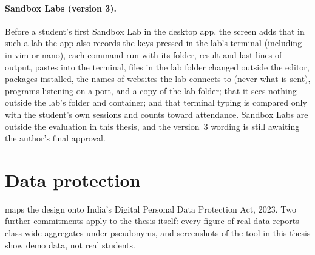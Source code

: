 \paragraph{Sandbox Labs (version 3).} Before a student's first Sandbox Lab in
the desktop app, the screen adds that in such a lab the app also records the
keys pressed in the lab's terminal (including in vim or nano), each command
run with its folder, result and last lines of output, pastes into the terminal,
files in the lab folder changed outside the editor, packages installed, the
names of websites the lab connects to (never what is sent), programs listening
on a port, and a copy of the lab folder; that it sees nothing outside the lab's
folder and container; and that terminal typing is compared only with the
student's own sessions and counts toward attendance. Sandbox Labs are outside
the evaluation in this thesis, and the version~3 wording is still awaiting
the author's final approval.

\section{Data protection}
 maps the design onto India's Digital Personal Data Protection
Act, 2023. Two further commitments apply to the thesis itself: every figure of
real data reports class-wide aggregates under pseudonyms, and screenshots of
the tool in this thesis show demo data, not real students.
